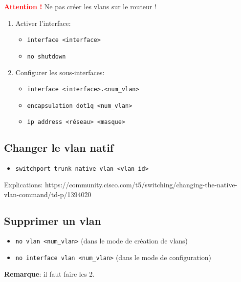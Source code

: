 \documentclass[a4paper]{article}
\begin{document}
\textcolor{red}{\textbf{Attention !}} Ne pas créer les vlans sur le routeur !
\begin{enumerate}
    \item Activer l'interface:
    \begin{itemize}[label=\textbf{–}]
        \item \texttt{interface <interface>}
        \item \texttt{no shutdown}
    \end{itemize}
    \item Configurer les sous-interfaces:
    \begin{itemize}[label=\textbf{–}]
        \item \texttt{interface <interface>.<num\_vlan>}
        \item \texttt{encapsulation dot1q <num\_vlan>}
        \item \texttt{ip address <réseau> <masque>}
    \end{itemize}
\end{enumerate}





\subsection{Changer le vlan natif}



\begin{itemize}[label=\textbf{–}]
    \item \texttt{switchport trunk native vlan <vlan\_id>}
\end{itemize}
Explications: https://community.cisco.com/t5/switching/changing-the-native-vlan-command/td-p/1394020





\subsection{Supprimer un vlan}



\begin{itemize}[label=\textbf{–}]
    \item \texttt{no vlan <num\_vlan>} (dans le mode de création de vlans)
    \item \texttt{no interface vlan <num\_vlan>} (dans le mode de configuration)
\end{itemize}
\textbf{Remarque}: il faut faire les 2.
\end{document}
